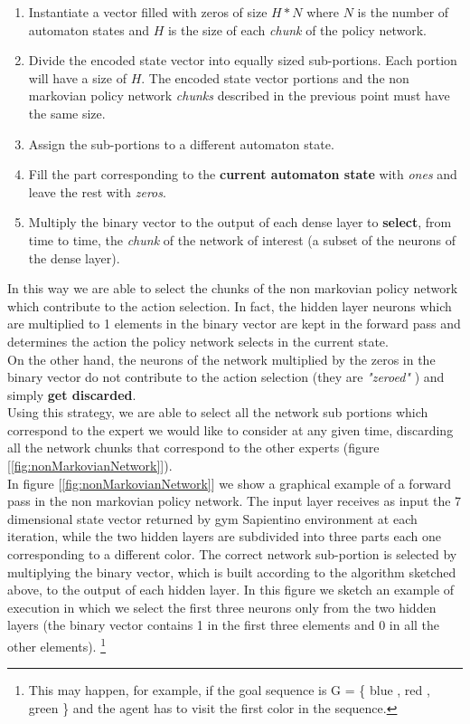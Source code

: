 \documentclass{article}
\begin{document}
\begin{enumerate}
    \item Instantiate a vector filled with zeros of size \(H * N\) where \(N\) is the number of automaton states and \(H\) is the size of each \textit{chunk} of the policy network.
    \item Divide the encoded state vector into equally sized sub-portions. Each portion will have a size of \(H\). The encoded state vector portions and the non markovian policy network \textit{chunks} described in the previous point must have the same size.
    \item Assign the sub-portions to a different automaton state.
    \item Fill the part corresponding to the \textbf{current automaton state} with \textit{ones} and leave the rest with \textit{zeros}.
    \item Multiply the binary vector to the output of each dense layer to \textbf{select}, from time to time, the \textit{chunk} of the network of interest (a subset of the neurons of the dense layer).
    \
\end{enumerate}
In this way we are able to select the chunks of the non markovian policy network which contribute to the action selection. In fact, the hidden layer neurons which are multiplied to 1 elements in the binary vector are kept in the forward pass and determines the action the policy network selects in the current state.\\ 
On the other hand, the neurons of the network multiplied by the zeros in the binary vector do not contribute to the action selection (they are \textit{"zeroed"} ) and simply \textbf{get discarded}.\\
Using this strategy, we are able to select all the network sub portions which correspond to the expert we would like to consider at any given time, discarding all the network chunks that correspond to the other experts (figure [\ref{fig:nonMarkovianNetwork}]).\\
In figure [\ref{fig:nonMarkovianNetwork}] we show a graphical example of a forward pass in the non markovian policy network. 
The input layer receives as input the 7 dimensional state vector returned by gym Sapientino environment at each iteration, while the two hidden layers are subdivided into three parts each one corresponding to a different color. The correct network sub-portion is selected by multiplying the binary vector, which is built according to the algorithm sketched above, to the output of each hidden layer. In this figure we sketch an example of execution in which we select the first three neurons only from the two hidden layers (the binary vector contains 1 in the first three elements and 0 in all the other elements). \footnote{This may happen, for example, if the goal sequence is G = \{\color{blue} blue \color{black}, \color{red} red \color{black},\color{green} green \color{black}\} and the agent has to visit the first color in the sequence.}
\end{document}

